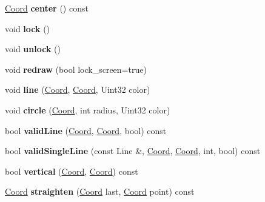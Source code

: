 \begin{DoxyCompactItemize}
\item 
\hypertarget{classGameGUI_a592ace24e5d51ac5a199b58be854eb46}{\hyperlink{structCoord}{Coord} {\bfseries center} () const }\label{classGameGUI_a592ace24e5d51ac5a199b58be854eb46}

\item 
\hypertarget{classGameGUI_ae55b18a0f3d6fc2e03544ec77358482c}{void {\bfseries lock} ()}\label{classGameGUI_ae55b18a0f3d6fc2e03544ec77358482c}

\item 
\hypertarget{classGameGUI_a0aa550e8ebc5ac6f93183edfd95fe471}{void {\bfseries unlock} ()}\label{classGameGUI_a0aa550e8ebc5ac6f93183edfd95fe471}

\item 
\hypertarget{classGameGUI_a319990b62283916ac319e703b8be1310}{void {\bfseries redraw} (bool lock\+\_\+screen=true)}\label{classGameGUI_a319990b62283916ac319e703b8be1310}

\item 
\hypertarget{classGameGUI_a875b89ee8751d94293bf329c9b759517}{void {\bfseries line} (\hyperlink{structCoord}{Coord}, \hyperlink{structCoord}{Coord}, Uint32 color)}\label{classGameGUI_a875b89ee8751d94293bf329c9b759517}

\item 
\hypertarget{classGameGUI_a49925f8ecdd22519d668b28d79badeb2}{void {\bfseries circle} (\hyperlink{structCoord}{Coord}, int radius, Uint32 color)}\label{classGameGUI_a49925f8ecdd22519d668b28d79badeb2}

\item 
\hypertarget{classGameGUI_aa2ecb2062a00e6d7e099fe0fd706313c}{bool {\bfseries valid\+Line} (\hyperlink{structCoord}{Coord}, \hyperlink{structCoord}{Coord}, bool) const }\label{classGameGUI_aa2ecb2062a00e6d7e099fe0fd706313c}

\item 
\hypertarget{classGameGUI_af786a5df1b7ae2d2d0309cda34d30c3c}{bool {\bfseries valid\+Single\+Line} (const Line \&, \hyperlink{structCoord}{Coord}, \hyperlink{structCoord}{Coord}, int, bool) const }\label{classGameGUI_af786a5df1b7ae2d2d0309cda34d30c3c}

\item 
\hypertarget{classGameGUI_aad8d3da450b57b150be4fc1c24594f47}{bool {\bfseries vertical} (\hyperlink{structCoord}{Coord}, \hyperlink{structCoord}{Coord}) const }\label{classGameGUI_aad8d3da450b57b150be4fc1c24594f47}

\item 
\hypertarget{classGameGUI_a12816d2f7a5043a03242186968a7c098}{\hyperlink{structCoord}{Coord} {\bfseries straighten} (\hyperlink{structCoord}{Coord} last, \hyperlink{structCoord}{Coord} point) const }\label{classGameGUI_a12816d2f7a5043a03242186968a7c098}


\end{DoxyCompactItemize}
